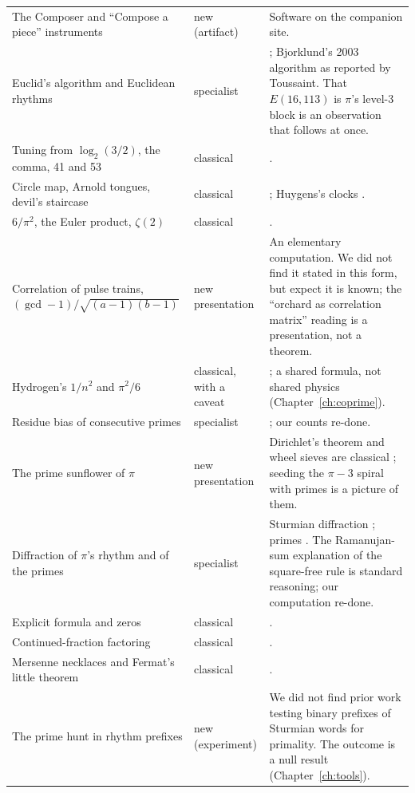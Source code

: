 \begin{longtable}{p{}p{}p{}}
The Composer and ``Compose a piece'' instruments & new (artifact) & Software on the companion site. \\
Euclid's algorithm and Euclidean rhythms & specialist & \citet{Toussaint2005,GomezTaslakianToussaint2009,CloughDouthett1991}; Bjorklund's 2003 algorithm as reported by Toussaint. That $E(16,113)$ is $\pi$'s level-3 block is an observation that follows at once. \\
Tuning from $\log_2(3/2)$, the comma, 41 and 53 & classical & \citet{Benson2006}. \\
Circle map, Arnold tongues, devil's staircase & classical & \citet{JensenBakBohr1983}; Huygens's clocks \citep{Bennett2002}. \\
$6/\pi^2$, the Euler product, $\zeta(2)$ & classical & \citet{Euler1740,Euler1744,HardyWright2008}. \\
Correlation of pulse trains, $(\gcd - 1)/\sqrt{(a-1)(b-1)}$ & new presentation & An elementary computation. We did not find it stated in this form, but expect it is known; the ``orchard as correlation matrix'' reading is a presentation, not a theorem. \\
Hydrogen's $1/n^2$ and $\pi^2/6$ & classical, with a caveat & \citet{Balmer1885}; a shared formula, not shared physics (Chapter~\ref{ch:coprime}). \\
Residue bias of consecutive primes & specialist & \citet{LemkeOliverSound2016}; our counts re-done. \\
The prime sunflower of $\pi$ & new presentation & Dirichlet's theorem and wheel sieves are classical \citep{HardyWright2008}; seeding the $\pi - 3$ spiral with primes is a picture of them. \\
Diffraction of $\pi$'s rhythm and of the primes & specialist & Sturmian diffraction \citep{BaakeGrimm2013}; primes \citep{Torquato2018}. The Ramanujan-sum explanation of the square-free rule is standard reasoning; our computation re-done. \\
Explicit formula and zeros & classical & \citet{Riemann1859,Mangoldt1895}. \\
Continued-fraction factoring & classical & \citet{LehmerPowers1931,MorrisonBrillhart1975}. \\
Mersenne necklaces and Fermat's little theorem & classical & \citet{Golomb1956}. \\
The prime hunt in rhythm prefixes & new (experiment) & We did not find prior work testing binary prefixes of Sturmian words for primality. The outcome is a null result (Chapter~\ref{ch:tools}). \\

\end{longtable}
